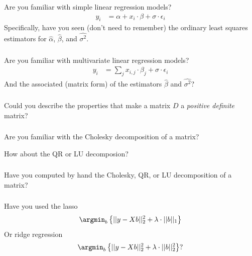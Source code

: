 \begin{frame}[fragile] \frametitle{}

Are you familiar with simple linear regression models?
\begin{align*}
y_i &= \alpha + x_i \cdot \beta + \sigma \cdot \epsilon_i
\end{align*}
\pause Specifically, have you seen (don't need to remember)
the ordinary least squares estimators for $\widehat{\alpha}$,
$\widehat{\beta}$, and $\widehat{\sigma^2}$.

\end{frame}

\begin{frame}[fragile] \frametitle{}

Are you familiar with multivariate linear regression models?
\begin{align*}
y_i &= \sum_j x_{i,j} \cdot \beta_j + \sigma \cdot \epsilon_i
\end{align*}
And the associated (matrix form) of the estimators $\widehat{\beta}$ and
$\widehat{\sigma^2}$?

\end{frame}

\begin{frame}[fragile] \frametitle{}

Could you describe the properties that make a matrix
$D$ a {\it positive definite} matrix?

\end{frame}

\begin{frame}[fragile] \frametitle{}

Are you familiar with the Cholesky decomposition of a matrix?

\pause How about the QR or LU decomposion?


\end{frame}

\begin{frame}[fragile] \frametitle{}

Have you computed by hand the Cholesky, QR, or LU decomposition of a matrix?

\end{frame}

\begin{frame}[fragile] \frametitle{}

Have you used the lasso
\begin{align*}
\argmin_b \left\{ || y - X b ||_2^2 + \lambda \cdot ||b||_1 \right\}
\end{align*}
\pause Or ridge regression
\begin{align*}
\argmin_b \left\{ || y - X b ||_2^2 + \lambda \cdot ||b||_2^2 \right\}?
\end{align*}

\end{frame}

